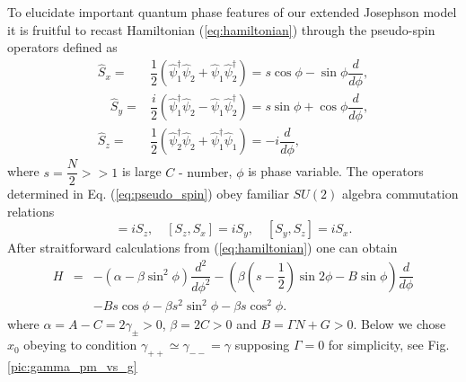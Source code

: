 \documentclass[aps, pre, preprint, groupedaddress, superscriptaddress, showkeys, showpacs] {revtex4-1}
\begin{document}
To elucidate important quantum phase features of our extended Josephson model it is fruitful to recast Hamiltonian (\ref{eq:hamiltonian}) through the pseudo-spin operators defined as
% 
\begin{subequations}
\begin{align}
\hat{S}_x = & \dfrac{1}{2} (\hat{\psi}_1^\dag \hat{\psi}_2 + \hat{\psi}_1 \hat{\psi}_2^\dag) = s \cos{\phi} - \sin{\phi} \dfrac{d}{d \phi}, \\
\quad \hat{S}_y = & \dfrac{i}{2} (\hat{\psi}_1^\dag \hat{\psi}_2 - \hat{\psi}_1 \hat{\psi}_2^\dag) = s \sin{\phi} + \cos{\phi} \dfrac{d}{d \phi}, \\
\hat{S}_z = & \dfrac{1}{2} (\hat{\psi}_2^\dag \hat{\psi}_2 + \hat{\psi}_1^\dag \hat{\psi}_1) = -i\dfrac{d}{d \phi},
\end{align}
\label{eq:pseudo_spin}
\end{subequations}
%
where $s = \dfrac{N}{2} >> 1$ is large {\red $C$ - number}, $\phi$ is phase variable.
The operators determined in Eq. (\ref{eq:pseudo_spin}) obey familiar $SU(2)$ algebra commutation relations
%
\begin{equation}
[S_x, S_y] = iS_z, \quad[S_z, S_x] = iS_y, \quad[S_y, S_z] = iS_x.
\label{eq:commutation_relations}
\end{equation}
%
After straitforward calculations from (\ref{eq:hamiltonian}) one can obtain
%
\begin{equation}
\begin{array}{lcl}
H & = & -(\alpha - \beta \sin^2 \phi) \dfrac{d^2}{d \phi^2} - (\beta(s-\dfrac{1}{2})\sin{2\phi} - B\sin{\phi}) \dfrac{d}{d \phi} \\
&& - Bs \cos \phi - \beta s^2 \sin^2 \phi - \beta s \cos^2 \phi.
\end{array}
\label{eq:hamiltinian_s}
\end{equation}
%
where $\alpha = A - C = 2\gamma_{\pm} > 0$, $\beta = 2C > 0$ and $B = \Gamma N + G > 0$.
Below we chose $x_0$ obeying to condition $\gamma_{++} \simeq \gamma_{--} = \gamma$ supposing $\Gamma = 0$ for simplicity, see Fig. \ref{pic:gamma_pm_vs_g}
\end{document}
